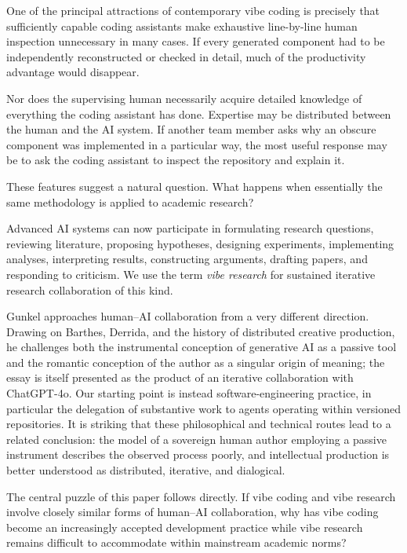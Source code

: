 One of the principal attractions of contemporary vibe coding is precisely that sufficiently capable coding assistants make exhaustive line-by-line human inspection unnecessary in many cases. If every generated component had to be independently reconstructed or checked in detail, much of the productivity advantage would disappear.

Nor does the supervising human necessarily acquire detailed knowledge of everything the coding assistant has done. Expertise may be distributed between the human and the AI system. If another team member asks why an obscure component was implemented in a particular way, the most useful response may be to ask the coding assistant to inspect the repository and explain it.

These features suggest a natural question. What happens when essentially the same methodology is applied to academic research?

Advanced AI systems can now participate in formulating research questions, reviewing literature, proposing hypotheses, designing experiments, implementing analyses, interpreting results, constructing arguments, drafting papers, and responding to criticism. We use the term \emph{vibe research} for sustained iterative research collaboration of this kind.

Gunkel \citep{gunkel2025prompted} approaches human--AI collaboration from a very different direction. Drawing on Barthes, Derrida, and the history of distributed creative production, he challenges both the instrumental conception of generative AI as a passive tool and the romantic conception of the author as a singular origin of meaning; the essay is itself presented as the product of an iterative collaboration with ChatGPT-4o. Our starting point is instead software-engineering practice, in particular the delegation of substantive work to agents operating within versioned repositories. It is striking that these philosophical and technical routes lead to a related conclusion: the model of a sovereign human author employing a passive instrument describes the observed process poorly, and intellectual production is better understood as distributed, iterative, and dialogical.

The central puzzle of this paper follows directly. If vibe coding and vibe research involve closely similar forms of human--AI collaboration, why has vibe coding become an increasingly accepted development practice while vibe research remains difficult to accommodate within mainstream academic norms?


